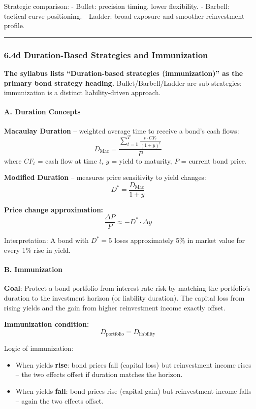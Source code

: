 \documentclass[
]{article}
\begin{document}
Strategic comparison: - Bullet: precision timing, lower flexibility. -
Barbell: tactical curve positioning. - Ladder: broad exposure and
smoother reinvestment profile.

\begin{center}\rule{0.5\linewidth}{0.5pt}\end{center}

\hypertarget{duration-immunization}{%
\subsubsection{6.4d Duration-Based Strategies and Immunization}\label{duration-immunization}}

\textbf{The syllabus lists ``Duration-based strategies (immunization)'' as the primary bond strategy heading.} Bullet/Barbell/Ladder are sub-strategies; immunization is a distinct liability-driven approach.

\paragraph{A. Duration Concepts}

\textbf{Macaulay Duration} -- weighted average time to receive a bond's cash flows:
\[
D_{\text{Mac}} = \frac{\displaystyle\sum_{t=1}^{T} \frac{t\cdot CF_t}{(1+y)^t}}{P}
\]
where $CF_t$ = cash flow at time $t$, $y$ = yield to maturity, $P$ = current bond price.

\textbf{Modified Duration} -- measures price sensitivity to yield changes:
\[
D^* = \frac{D_{\text{Mac}}}{1+y}
\]

\textbf{Price change approximation:}
\[
\frac{\Delta P}{P} \approx -D^* \cdot \Delta y
\]

Interpretation: A bond with $D^* = 5$ loses approximately 5\% in market value for every 1\% rise in yield.

\paragraph{B. Immunization}

\textbf{Goal}: Protect a bond portfolio from interest rate risk by matching the portfolio's duration to the investment horizon (or liability duration). The capital loss from rising yields and the gain from higher reinvestment income exactly offset.

\textbf{Immunization condition:}
\[
D_{\text{portfolio}} = D_{\text{liability}}
\]

Logic of immunization:
\begin{itemize}
\item When yields \textbf{rise}: bond prices fall (capital loss) but reinvestment income rises -- the two effects offset if duration matches the horizon.
\item When yields \textbf{fall}: bond prices rise (capital gain) but reinvestment income falls -- again the two effects offset.
\end{itemize}
\end{document}
